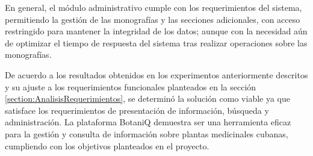 En general, el módulo administrativo cumple con los requerimientos del sistema, permitiendo la gestión de las monografías y las secciones adicionales, 
con acceso restringido para mantener la integridad de los datos; aunque con la necesidad aún de optimizar el tiempo de respuesta del sistema tras
realizar operaciones sobre las monografías.

De acuerdo a los resultados obtenidos en los experimentos anteriormente descritos y su ajuste a los requerimientos funcionales planteados en la 
sección \ref{section:AnalisisRequerimientos}, se determinó la solución como viable ya que satisface los requerimientos de presentación de información, búsqueda y administración. 
La plataforma BotaniQ demuestra ser una herramienta eficaz para la gestión y consulta de información sobre plantas medicinales cubanas, 
cumpliendo con los objetivos planteados en el proyecto.
